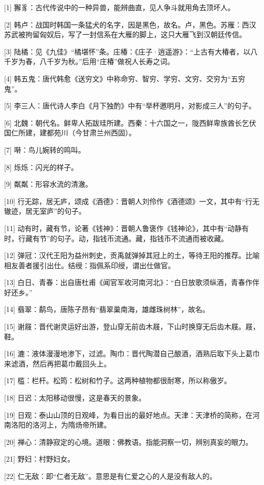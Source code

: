 \documentclass[12pt,UTF8]{ctexbook}
\begin{document}
[1] 獬豸：古代传说中的一种异兽，能辨曲直，见人争斗就用角去顶坏人。

[2] 韩卢：战国时韩国一条猛犬的名字，因是黑色，故名。卢，黑色。苏雁：西汉苏武被拘留匈奴后，写了一封信系在大雁的脚上，这只大雁飞到汉朝廷传信。

[3] 陆橘：见《九佳》“橘堪怀”条。庄椿：《庄子·逍遥游》：“上古有大椿者，以八千岁为春，八千岁为秋。”后用“庄椿”做祝人长寿之词。

[4] 韩五鬼：唐代韩愈《送穷文》中称命穷、智穷、学穷、文穷、交穷为“五穷鬼”。

[5] 李三人：唐代诗人李白《月下独酌》中有“举杯邀明月，对影成三人”的句子。

[6] 北魏：朝代名。鲜卑人拓跋珪所建。西秦：十六国之一，陇西鲜卑族酋长乞伏国仁所建，建都苑川（今甘肃兰州西固）。

[7] 啭：鸟儿婉转的鸣叫。

[8] 烁烁：闪光的样子。

[9] 粼粼：形容水流的清澈。

[10] 行无踪，居无庐，颂成《酒德》：晋朝人刘伶作《酒德颂》一文，其中有“行无辙迹，居无室庐”的句子。

[11] 动有时，藏有节，论著《钱神》：晋朝人鲁褒作《钱神论》，其中有“动静有时，行藏有节”的句子。动，指钱币流通。藏，指钱币不流通而被收藏。

[12] 弹冠：汉代王阳为益州刺史，贡禹就弹掉其冠上的土，等待王阳的推荐。比喻相友善者援引出仕。结绶：指佩系印绶，谓出仕做官。

[13] 白日、青春：出自唐杜甫《闻官军收河南河北》：“白日放歌须纵酒，青春作伴好还乡。”

[14] 翡翠：鹬鸟，唐陈子昂有“翡翠巢南海，雄雌珠树林”，故名。

[15] 谢屐：晋代谢灵运好出游，登山穿无前齿木屐，下山时换穿无后齿木屐。屐，鞋。

[16] 漉：液体漫漫地渗下，过滤。陶巾：晋代陶潜自己酿酒，酒熟后取下头上葛巾来滤酒，然后再把葛巾戴回头上。

[17] 槛：栏杆。松筠：松树和竹子。这两种植物都很耐寒，所以称傲岁。

[18] 日迟：太阳移动很慢，这是春天的景象。

[19] 日观：泰山山顶的日观峰，为看日出的最好地点。天津：天津桥的简称，在河南洛阳的洛河上，为隋炀帝所建。

[20] 禅心：清静寂定的心境。道眼：佛教语。指能洞察一切，辨别真妄的眼力。

[21] 野妇：村野妇女。

[22] 仁无敌：即“仁者无敌”。意思是有仁爱之心的人是没有敌人的。
\end{document}
